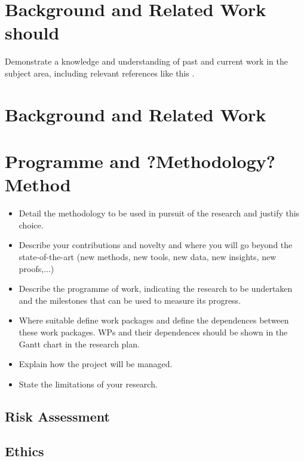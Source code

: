 \section{Background and Related Work
should}\label{background-and-related-work-should}

Demonstrate a knowledge and understanding of past and current work in
the subject area, including relevant references like this
\citep{template}.

\section{Background and Related Work}\label{background-and-related-work}

\section{Programme and ?Methodology?
Method}\label{programme-and-methodology-method}

\begin{itemize}
\item
  Detail the methodology to be used in pursuit of the research and
  justify this choice.
\item
  Describe your contributions and novelty and where you will go beyond
  the state-of-the-art (new methods, new tools, new data, new insights,
  new proofs,...)
\item
  Describe the programme of work, indicating the research to be
  undertaken and the milestones that can be used to measure its
  progress.
\item
  Where suitable define work packages and define the dependences between
  these work packages. WPs and their dependences should be shown in the
  Gantt chart in the research plan.
\item
  Explain how the project will be managed.
\item
  State the limitations of your research.
\end{itemize}

\subsection{Risk Assessment}\label{risk-assessment}

\subsection{Ethics}\label{ethics}

